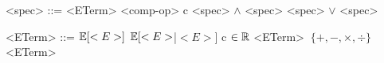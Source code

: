 \begin{grammar}
             <spec> ::= <ETerm>  <comp-op>  c 
                \alt <spec> $\land$ <spec>              
                \alt <spec> $\lor$ <spec> 
        
            <ETerm> ::= $\mathbb{E}[<E>]$
                \alt   $\mathbb{E}[<E>$|$<E>]$
                \alt   c $\in \mathbb{R}$
                \alt   <ETerm> $\ \{+, -, \times, \div \}\ $ <ETerm>
\end{grammar}